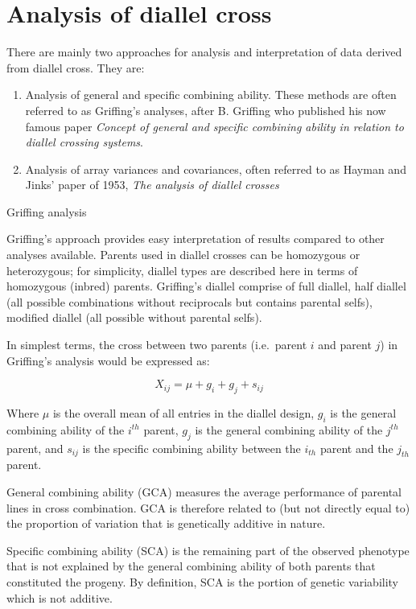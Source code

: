 \documentclass[11pt,dvipsnames,ignorenonframetext,aspectratio=169]{beamer}
\providecommand{\tightlist}{%
  \setlength{\itemsep}{0pt}\setlength{\parskip}{0pt}}
\begin{document}
\hypertarget{analysis-of-diallel-cross}{%
\section{Analysis of diallel cross}\label{analysis-of-diallel-cross}}

\begin{frame}{}
\protect\hypertarget{section-11}{}
There are mainly two approaches for analysis and interpretation of data
derived from diallel cross. They are:

\begin{enumerate}
\tightlist
\item
  Analysis of general and specific combining ability. These methods are
  often referred to as Griffing's analyses, after B. Griffing who
  published his now famous paper \emph{Concept of general and specific
  combining ability in relation to diallel crossing systems}.
\item
  Analysis of array variances and covariances, often referred to as
  Hayman and Jinks' paper of 1953, \emph{The analysis of diallel
  crosses}
\end{enumerate}
\end{frame}

\begin{frame}{Griffing analysis}
\protect\hypertarget{griffing-analysis}{}
\footnotesize

Griffing's approach provides easy interpretation of results compared to
other analyses available. Parents used in diallel crosses can be
homozygous or heterozygous; for simplicity, diallel types are described
here in terms of homozygous (inbred) parents. Griffing's diallel
comprise of full diallel, half diallel (all possible combinations
without reciprocals but contains parental selfs), modified diallel (all
possible without parental selfs).

In simplest terms, the cross between two parents (i.e.~parent \(i\) and
parent \(j\)) in Griffing's analysis would be expressed as:

\[
X_{ij} = \mu + g_i + g_j + s_{ij}
\]

Where \(\mu\) is the overall mean of all entries in the diallel design,
\(g_i\) is the general combining ability of the \(i^{th}\) parent,
\(g_j\) is the general combining ability of the \(j^{th}\) parent, and
\(s_{ij}\) is the specific combining ability between the \(i_{th}\)
parent and the \(j_{th}\) parent.
\end{frame}

\begin{frame}{}
\protect\hypertarget{section-12}{}
General combining ability (GCA) measures the average performance of
parental lines in cross combination. GCA is therefore related to (but
not directly equal to) the proportion of variation that is genetically
additive in nature.

Specific combining ability (SCA) is the remaining part of the observed
phenotype that is not explained by the general combining ability of both
parents that constituted the progeny. By definition, SCA is the portion
of genetic variability which is not additive.
\end{frame}
\end{document}
